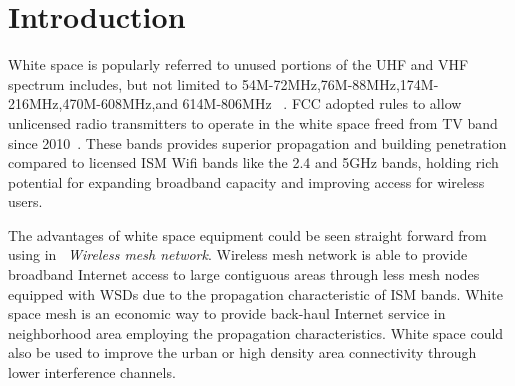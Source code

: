 \section{Introduction}
\label{sec:introduction}

White space is popularly referred to unused portions of the UHF and VHF spectrum includes, but not limited to 54M-72MHz,76M-88MHz,174M-216MHz,470M-608MHz,and 614M-806MHz ~\cite{whitespacewiki}.
FCC adopted rules to allow unlicensed radio transmitters to operate in the white space freed from TV band since 2010~\cite{fccwhitespace}. 
 These bands provides superior propagation and building penetration compared to licensed ISM Wifi bands like the 2.4 and 5GHz bands, holding rich potential for expanding broadband capacity and improving access for wireless users.


The advantages of white space equipment could be seen straight forward from using in ~\emph{Wireless mesh network}.
Wireless mesh network is able to provide broadband Internet access to large contiguous areas through less mesh nodes equipped with WSDs due to the propagation characteristic of ISM bands. 
White space mesh is an economic way to provide back-haul Internet service in neighborhood area employing the propagation characteristics.
White space could also be used to improve the urban or high density area connectivity through lower interference channels. 

